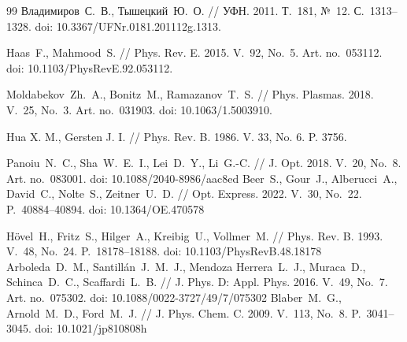 \documentclass[12pt, a4paper]{article}
\begin{document}
\begin{thebibliography}{99}
Владимиров~С.~В., Тышецкий~Ю.~О. // УФН. 2011. Т.~181, №~12. С.~1313–1328. doi: 10.3367/UFNr.0181.201112g.1313.


Haas~F., Mahmood~S. // Phys. Rev. E. 2015. V.~92, No.~5. Art. no.~053112. doi: 10.1103/PhysRevE.92.053112.

Moldabekov~Zh.~A., Bonitz~M., Ramazanov~T.~S. // Phys. Plasmas. 2018. V.~25, No.~3. Art. no.~031903. doi: 10.1063/1.5003910.




Hua X. M., Gersten J. I. // Phys. Rev. B. 1986. V. 33, No. 6. P. 3756.


Panoiu~N.~C., Sha~W.~E.~I., Lei~D.~Y., Li~G.-C. // J. Opt. 2018. V.~20, No.~8. Art. no.~083001. doi: 10.1088/2040-8986/aac8ed
Beer~S., Gour~J., Alberucci~A., David~C., Nolte~S., Zeitner~U.~D. // Opt. Express. 2022. V.~30, No.~22. P.~40884--40894. doi: 10.1364/OE.470578

H\"{o}vel~H., Fritz~S., Hilger~A., Kreibig~U., Vollmer~M. // Phys. Rev. B. 1993. V.~48, No.~24. P.~18178--18188. doi: 10.1103/PhysRevB.48.18178
Arboleda~D.~M., Santillán~J.~M.~J., Mendoza Herrera~L.~J., Muraca~D., Schinca~D.~C., Scaffardi~L.~B. // J. Phys. D: Appl. Phys. 2016. V.~49, No.~7. Art. no.~075302. doi: 10.1088/0022-3727/49/7/075302
Blaber~M.~G., Arnold~M.~D., Ford~M.~J. // J. Phys. Chem. C. 2009. V.~113, No.~8. P.~3041--3045. doi: 10.1021/jp810808h
\end{thebibliography}

\newpage
\end{document}
